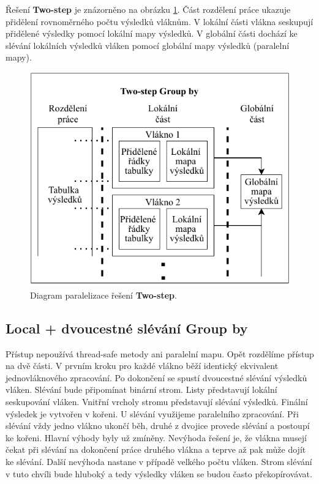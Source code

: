 Řešení \textbf{Two-step} je znázorněno na obrázku \ref{figure.diaTwoGr}.
Část rozdělení práce ukazuje přidělení rovnoměrného počtu výsledků vláknům.
V lokální části vlákna seskupují přidělené výsledky pomocí lokální mapy výsledků.
V globální části dochází ke slévání lokálních výsledků vláken pomocí globální mapy výsledků (paralelní mapy).

\begin{figure}[!htp]
\includegraphics{../img/diaTwoGr.pdf}\centering
\caption{Diagram paralelizace řešení \textbf{Two-step}.}
\label{figure.diaTwoGr}
\end{figure}


\subsection{Local + dvoucestné slévání Group by} \label{anal.groupby.local}

Přístup nepoužívá thread-safe metody ani paralelní mapu.
Opět rozdělíme přístup na dvě části.
V prvním kroku pro každé vlákno běží identický ekvivalent jednovláknového zpracování.
Po dokončení se spustí dvoucestné slévání výsledků vláken.
Slévání bude připomínat binární strom.
Listy představují lokální seskupování vláken.
Vnitřní vrcholy stromu představují slévání výsledků.
Finální výsledek je vytvořen v kořeni.
U slévání využijeme paralelního zpracování.
Při slévání vždy jedno vlákno ukončí běh, druhé z dvojice provede slévání a postoupí ke kořeni. 
Hlavní výhody byly už zmíněny.
Nevýhoda řešení je, že vlákna musejí čekat při slévání na dokončení práce druhého vlákna a teprve až pak může dojít ke slévání.
Další nevýhoda nastane v případě velkého počtu vláken.
Strom slévání v tuto chvíli bude hluboký a tedy výsledky vláken se budou často překopírovávat. 

